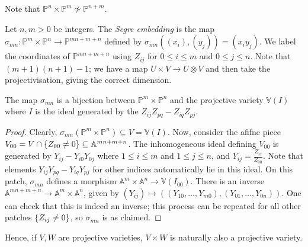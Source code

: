 Note that \( \mathbb P^n \times \mathbb P^m \not\simeq \mathbb P^{n+m} \).
\begin{example}
    Let \( n, m > 0 \) be integers.
    The \emph{Segre embedding} is the map \( \sigma_{mn} \colon \mathbb P^m \times \mathbb P^n \to \mathbb P^{mn+m+n} \) defined by \( \sigma_{mn}((x_i), (y_j)) = (x_i y_j) \).
    We label the coordinates of \( \mathbb P^{mn+m+n} \) using \( Z_{ij} \) for \( 0 \leq i \leq m \) and \( 0 \leq j \leq n \).
    Note that \( (m+1)(n+1) - 1 \); we have a map \( U \times V \to U \otimes V \) and then take the projectivisation, giving the correct dimension.
\end{example}
\begin{theorem}
    The map \( \sigma_{mn} \) is a bijection between \( \mathbb P^m \times \mathbb P^n \) and the projective variety \( \mathbb V(I) \) where \( I \) is the ideal generated by the \( Z_{ij} Z_{pq} - Z_{iq} Z_{pj} \).
\end{theorem}
\begin{proof}
    Clearly, \( \sigma_{mn}(\mathbb P^m \times \mathbb P^n) \subseteq V = \mathbb V(I) \).
    Now, consider the afifne piece \( V_{00} = V \cap \qty{Z_{00} \neq 0} \subseteq \mathbb A^{mn+m+n} \).
    The inhomogeneous ideal defining \( V_{00} \) is generated by \( Y_{ij} - Y_{i0} Y_{0j} \) where \( 1 \leq i \leq m \) and \( 1 \leq j \leq n \), and \( Y_{ij} = \frac{Z_{ij}}{Z_{00}} \).
    Note that elements \( Y_{ij} Y_{pq} - Y_{iq} Y_{pj} \) for other indices automatically lie in this ideal.
    On this patch, \( \sigma_{mn} \) defines a morphism \( \mathbb A^m \times \mathbb A^n \to \mathbb V(I_{00}) \).
    There is an inverse \( \mathbb A^{mn+m+n} \to \mathbb A^m \times \mathbb A^n \), given by \( (Y_{ij}) \mapsto ((Y_{10}, \dots, Y_{m0}), (Y_{01}, \dots, Y_{0n})) \).
    One can check that this is indeed an inverse; this process can be repeated for all other patches \( \qty{Z_{ij} \neq 0} \), so \( \sigma_{mn} \) is as claimed.
\end{proof}
Hence, if \( V, W \) are projective varieties, \( V \times W \) is naturally also a projective variety.

